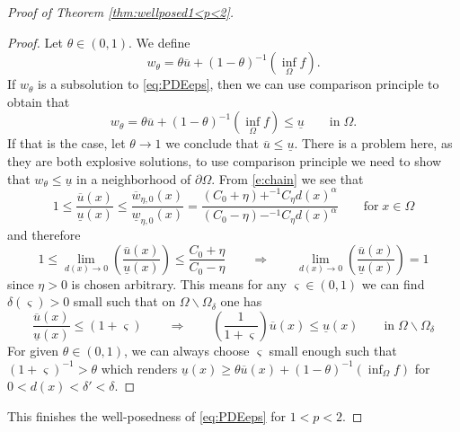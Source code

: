 \documentclass[11pt,reqno]{amsart}
\numberwithin{figure}{section}
\theoremstyle{plain}
\theoremstyle{remark}
\numberwithin{equation}{section}
\begin{document}
\begin{appendices}
\begin{proof} [Proof of Theorem \ref{thm:wellposed1<p<2}]
\begin{proof} Let $\theta\in (0,1)$. We define
\begin{equation*}
    w_\theta = \theta \overline{u} + (1-\theta) ^{-1}\left(\inf_{\Omega} f\right).
\end{equation*}
If $w_\theta$ is a subsolution to \eqref{eq:PDEeps}, then we can use comparison principle to obtain that
\begin{equation*}
    w_\theta = \theta \overline{u} + (1-\theta) ^{-1}\left(\inf_{\Omega} f\right) \leq \underline{u} \qquad\text{in}\;\Omega.
\end{equation*}
If that is the case, let $\theta\to 1$ we conclude that $\overline{u} \leq \underline{u}$. There is a problem here, as they are both explosive solutions, to use comparison principle we need to show that $w_\theta \leq \underline{u}$ in a neighborhood of $\partial\Omega$. From \eqref{e:chain} we see that
\begin{equation*}
    1\leq \frac{\overline{u}(x)}{\underline{u}(x)} \leq \frac{\overline{w}_{\eta,0}(x)}{\underline{w}_{\eta,0}(x)} = \frac{(C_0+\eta)+ ^{-1}C_\eta d(x)^\alpha}{(C_0-\eta)- ^{-1}C_\eta d(x)^\alpha} \qquad\text{for}\;x\in \Omega
\end{equation*}
and therefore
\begin{equation*}
   1\leq  \lim_{d(x)\to 0} \left(\frac{\overline{u}(x)}{\underline{u}(x)}\right) \leq \frac{C_0+\eta}{C_0-\eta} \qquad\Longrightarrow\qquad  \lim_{d(x)\to 0} \left(\frac{\overline{u}(x)}{\underline{u}(x)}\right) = 1
\end{equation*}
since $\eta>0$ is chosen arbitrary. This means for any $\varsigma\in(0,1)$ we can find $\delta(\varsigma)>0$ small such that on $\Omega\backslash \Omega_\delta$ one has
\begin{equation*}
\frac{\overline{u}(x)}{\underline{u}(x)}\leq (1+\varsigma)     \qquad\Longrightarrow\qquad \left(\frac{1}{1+\varsigma}\right)\overline{u}(x) \leq \underline{u}(x) \qquad\text{in}\; \Omega\backslash \Omega_\delta
\end{equation*}
For given $\theta\in (0,1)$, we can always choose $\varsigma$ small enough such that $(1+\varsigma)^{-1} > \theta$ which renders $\underline{u}(x) \geq \theta \overline{u}(x) + (1-\theta) ^{-1}\left(\inf_\Omega f\right)$ for $0< d(x) < \delta' < \delta$.
\end{proof}
\noindent This finishes the well-posedness of \eqref{eq:PDEeps} for $1<p<2$.
\end{proof}



\end{appendices}
\end{document}
